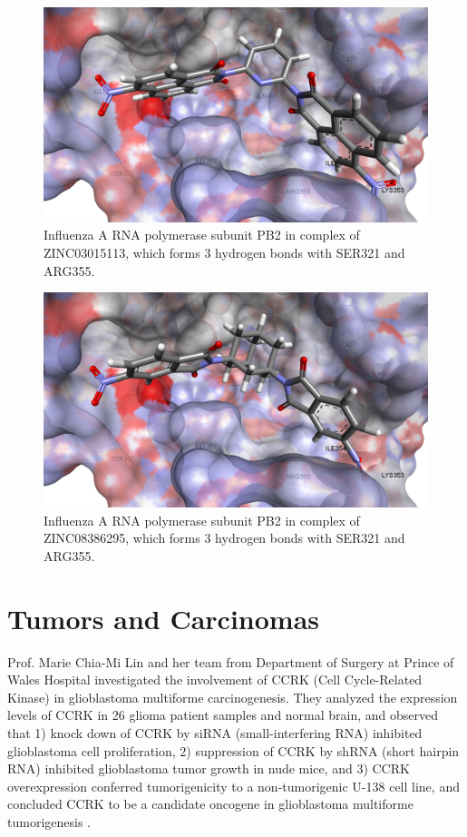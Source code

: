 \begin{figure}
\centering
\includegraphics[width=\linewidth]{Case/2VQZ-ZINC03015113.png}
\caption{Influenza A RNA polymerase subunit PB2 in complex of ZINC03015113, which forms 3 hydrogen bonds with SER321 and ARG355.}
\label{Case:2VQZ-ZINC03015113}
\end{figure}

\begin{figure}
\centering
\includegraphics[width=\linewidth]{Case/2VQZ-ZINC08386295.png}
\caption{Influenza A RNA polymerase subunit PB2 in complex of ZINC08386295, which forms 3 hydrogen bonds with SER321 and ARG355.}
\label{Case:2VQZ-ZINC08386295}
\end{figure}

\section{Tumors and Carcinomas}

Prof. Marie Chia-Mi Lin and her team from Department of Surgery at Prince of Wales Hospital investigated the involvement of CCRK (Cell Cycle-Related Kinase) in glioblastoma multiforme carcinogenesis. They analyzed the expression levels of CCRK in 26 glioma patient samples and normal brain, and observed that 1) knock down of CCRK by siRNA (small-interfering RNA) inhibited glioblastoma cell proliferation, 2) suppression of CCRK by shRNA (short hairpin RNA) inhibited glioblastoma tumor growth in nude mice, and 3) CCRK overexpression conferred tumorigenicity to a non-tumorigenic U-138 cell line, and concluded CCRK to be a candidate oncogene in glioblastoma multiforme tumorigenesis \citep{1144}.

